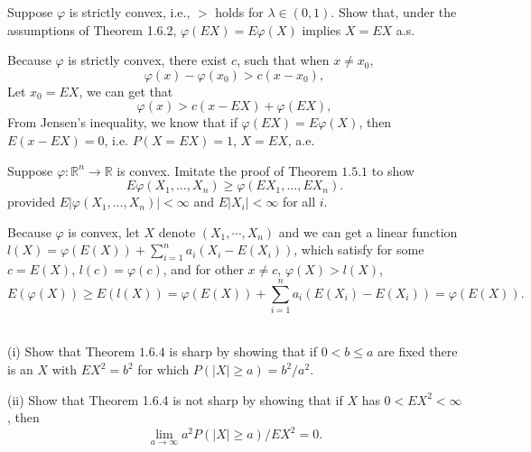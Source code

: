 \documentclass[en, normal, 11pt, black]{elegantnote}
\newenvironment{exercise}[1]{\begin{tcolorbox}[colback=black!15, colframe=black!80, breakable, title=#1]}{\end{tcolorbox}}
\renewenvironment{proof}{\begin{tcolorbox}[colback=white, colframe=black!50, breakable, title=Proof. ]\setlength{\parskip}{0.8em}}{\\\rightline{$\square$}\end{tcolorbox}}
\begin{document}

    \begin{exercise}{1.6.1}
        Suppose $\varphi$ is strictly convex, i.e., $>$ holds for $\lambda \in(0,1)$. Show that, under the assumptions of Theorem 1.6.2, $\varphi(E X)=E \varphi(X)$ implies $X=E X$ a.s. 
    \end{exercise}

    \begin{proof}
        Because $\varphi$ is strictly convex, there exist $c$, such that when $x\not=x_0$, 
        \[
            \varphi(x)-\varphi(x_0)>c(x-x_0), 
        \]
        Let $x_0=EX$, we can get that 
        \[
            \varphi(x)>c(x-EX)+\varphi(EX), 
        \]
        From Jensen's inequality, we know that if $\varphi(EX)=E\varphi(X)$, then $E(x-EX)=0$, i.e. $P(X=EX)=1$, $X=EX$, a.e. 
    \end{proof}


    \begin{exercise}{1.6.2}
        Suppose $\varphi: \mathbb{R}^{n} \rightarrow \mathbb{R}$ is convex. Imitate the proof of Theorem $1.5.1$ to show
        \[
            E \varphi\left(X_{1}, \ldots, X_{n}\right) \geq \varphi\left(E X_{1}, \ldots, E X_{n}\right). 
        \]
        provided $E\left|\varphi\left(X_{1}, \ldots, X_{n}\right)\right|<\infty$ and $E\left|X_{i}\right|<\infty$ for all $i$. 
    \end{exercise}

    \begin{proof}
        Because $\varphi$ is convex, let $X$ denote $(X_1, \cdots, X_n)$ and we can get a linear function $l(X)=\varphi(E(X))+\sum_{i=1}^na_i(X_i-E(X_i))$, which satisfy for some $c=E(X)$, $l(c)=\varphi(c)$, and for other $x\not=c$, $\varphi(X)>l(X)$, 
        \[
            E(\varphi(X))\geqslant E\left(l(X)\right)=\varphi(E(X))+\sum_{i=1}^na_i(E(X_i)-E(X_i))=\varphi(E(X)). 
        \]
        \vspace{-30pt}
    \end{proof}


    \begin{exercise}{1.6.3. Chebyshev's inequality is and is not sharp.}        
        (i) Show that Theorem $1.6.4$ is sharp by showing that if $0<b \leq a$ are fixed there is an $X$ with $E X^{2}=b^{2}$ for which $P(|X| \geq a)=b^{2} / a^{2}$. 
        
        (ii) Show that Theorem 1.6.4 is not sharp by showing that if $X$ has $0<E X^{2}<\infty$, then
        \[
            \lim _{a \rightarrow \infty} a^{2} P(|X| \geq a) / E X^{2}=0. 
        \]
    \end{exercise}
\end{document}
